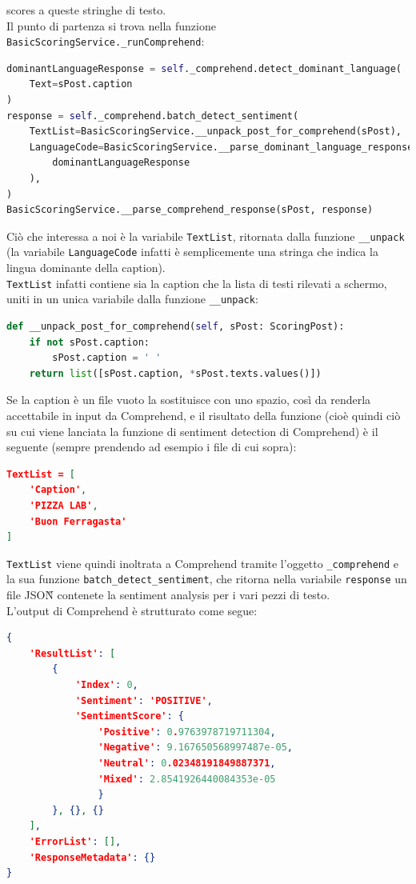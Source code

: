 scores a queste stringhe di testo.\\
Il punto di partenza si trova nella funzione \verb+BasicScoringService._runComprehend+:
\begin{lstlisting}[language=Python]
dominantLanguageResponse = self._comprehend.detect_dominant_language(
    Text=sPost.caption
)
response = self._comprehend.batch_detect_sentiment(
    TextList=BasicScoringService.__unpack_post_for_comprehend(sPost),
    LanguageCode=BasicScoringService.__parse_dominant_language_response(
        dominantLanguageResponse
    ),
)
BasicScoringService.__parse_comprehend_response(sPost, response)
\end{lstlisting}
Ciò che interessa a noi è la variabile \verb+TextList+, ritornata dalla funzione \verb+__unpack+ 
(la variabile \verb+LanguageCode+ infatti è semplicemente una stringa che indica la lingua dominante della caption).\\
\verb+TextList+ infatti contiene sia la caption che la lista di testi rilevati a schermo, uniti in un
unica variabile dalla funzione \verb+__unpack+:
\begin{lstlisting}[language=Python]
def __unpack_post_for_comprehend(self, sPost: ScoringPost):
    if not sPost.caption:
        sPost.caption = ' '  
    return list([sPost.caption, *sPost.texts.values()])
\end{lstlisting}
Se la caption è un file vuoto la sostituisce con uno spazio, così da renderla accettabile in input
da Comprehend, e il risultato della funzione (cioè quindi ciò su cui viene lanciata la funzione di
sentiment detection di Comprehend) è il seguente (sempre prendendo ad esempio i file di cui sopra):
\begin{lstlisting}[language=JSON]
TextList = [
    'Caption',
    'PIZZA LAB',
    'Buon Ferragasta'
]
\end{lstlisting}
\verb+TextList+ viene quindi inoltrata a Comprehend tramite l'oggetto \verb+_comprehend+ e la sua
funzione \verb+batch_detect_sentiment+, che ritorna nella variabile \verb+response+ un file JSON\G{}
contenete la sentiment analysis per i vari pezzi di testo.\\
L'output di Comprehend è strutturato come segue:
\begin{lstlisting}[language=JSON]
{
    'ResultList': [
        {
            'Index': 0, 
            'Sentiment': 'POSITIVE', 
            'SentimentScore': {
                'Positive': 0.9763978719711304, 
                'Negative': 9.167650568997487e-05, 
                'Neutral': 0.02348191849887371, 
                'Mixed': 2.8541926440084353e-05
                }
        }, {}, {}
    ], 
    'ErrorList': [], 
    'ResponseMetadata': {}
}
\end{lstlisting}
